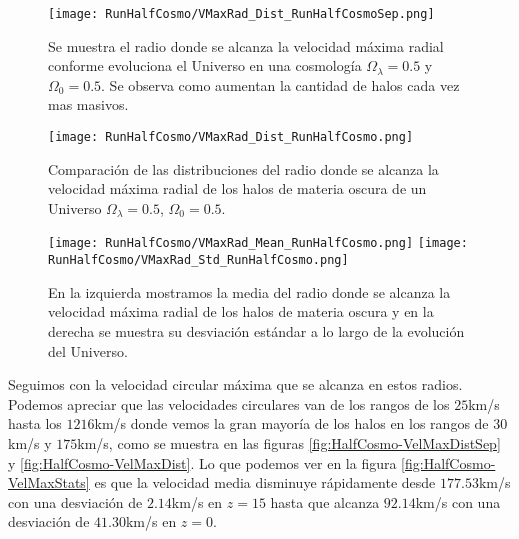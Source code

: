 \begin{figure}[H]
    \centering
    \texttt{[image: RunHalfCosmo/VMaxRad\_Dist\_RunHalfCosmoSep.png]}
    \caption[Radio donde se alcanza la velocidad máxima radial en la evolución de un Universo $\Omega_\lambda = 0.5$, $\Omega_0 = 0.5$]{\footnotesize Se muestra el radio donde se alcanza la velocidad máxima radial conforme evoluciona el Universo en una cosmología $\Omega_\lambda = 0.5$ y $\Omega_0 = 0.5$. Se observa como aumentan la cantidad de halos cada vez mas masivos.}
    \label{fig:HalfCosmo-VMaxRadDistSep}
\end{figure}

\begin{figure}[H]
    \centering
    \texttt{[image: RunHalfCosmo/VMaxRad\_Dist\_RunHalfCosmo.png]}
    \caption[Distribución del radio donde se alcanza la velocidad máxima radial de un Universo $\Omega_\lambda = 0.5$, $\Omega_0 = 0.5$]{\footnotesize Comparación de las distribuciones del radio donde se alcanza la velocidad máxima radial de los halos de materia oscura de un Universo $\Omega_\lambda = 0.5$, $\Omega_0 = 0.5$.}
    \label{fig:HalfCosmo-VMaxRadDist}
\end{figure}

\begin{figure}[H]
    \centering
    \texttt{[image: RunHalfCosmo/VMaxRad\_Mean\_RunHalfCosmo.png]}
    \texttt{[image: RunHalfCosmo/VMaxRad\_Std\_RunHalfCosmo.png]}
    \caption[Media y desviación estándar del Radio donde se alcanza la velocidad máxima radial de un Universo $\Omega_\lambda = 0.5$, $\Omega_0 = 0.5$]{\footnotesize En la izquierda mostramos la media del radio donde se alcanza la velocidad máxima radial de los halos de materia oscura y en la derecha se muestra su desviación estándar a lo largo de la evolución del Universo.}
    \label{fig:HalfCosmo-VMaxRadStats}
\end{figure}

Seguimos con la velocidad circular máxima que se alcanza en estos radios. Podemos apreciar que las velocidades circulares van de los rangos de los $25$km/s hasta los $1216$km/s donde vemos la gran mayoría de los halos en los rangos de $30$km/s y $175$km/s, como se muestra en las figuras \ref{fig:HalfCosmo-VelMaxDistSep} y \ref{fig:HalfCosmo-VelMaxDist}. Lo que podemos ver en la figura \ref{fig:HalfCosmo-VelMaxStats} es que la velocidad  media disminuye rápidamente desde $177.53$km/s con una desviación de $2.14$km/s en $z=15$ hasta que alcanza $92.14$km/s con una desviación de $41.30$km/s en $z=0$. 

